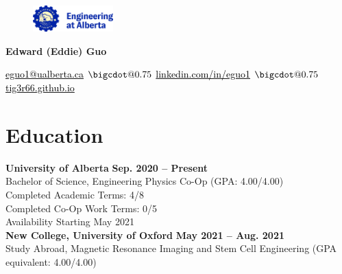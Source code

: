 \documentclass{article}
\makeatletter
\newcommand*\bigcdot{\mathpalette\bigcdot@{0.75}}
\newcommand*\bigcdot@[2]{\mathbin{\vcenter{\hbox{\scalebox{#2}{$\m@th#1\bullet$}}}}}
\makeatother
\begin{document}
\thispagestyle{plain}
\begin{figure} \vspace{-0.95em}
    \includegraphics[width=0.275\textwidth]{2020_coop_logo.jpeg}
\end{figure}

\LARGE \textbf{\textcolor{my_colour}{Edward (Eddie) Guo}} \vspace{.2em}

\normalfont \normalsize

\href{mailto:eguo1@ualberta.ca}{\textcolor{black}{eguo1@ualberta.ca}}
    \hspace{.15em} $\bigcdot$ \hspace{.15em}
\href{https://www.linkedin.com/in/eguo1}{\textcolor{black}{linkedin.com/in/eguo1}}
    \hspace{.15em} $\bigcdot$ \hspace{.15em}
\href{https://tig3r66.github.io/index.html}{\textcolor{black}{tig3r66.github.io}}

\vspace{-.25em}


\section*{\textcolor{my_colour}{Education}}
\vspace{-.25em} \hrulefill \vspace{.75em}

\textbf{University of Alberta} \hfill \textbf{Sep. 2020 -- Present}\\
Bachelor of Science, Engineering Physics Co-Op (GPA: 4.00/4.00) \\
Completed Academic Terms: 4/8 \\
Completed Co-Op Work Terms: 0/5 \\
Availability Starting May 2021 \\
  

\textbf{New College, University of Oxford} \hfill \textbf{May 2021 -- Aug. 2021}\\
Study Abroad, Magnetic Resonance Imaging and Stem Cell Engineering (GPA equivalent: 4.00/4.00) \\
\end{document}
